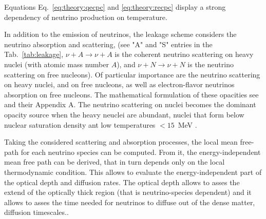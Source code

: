 %
Equations Eq.~\eqref{eq:theory:qecpc} and \eqref{eq:theory:recpc} display a strong dependency 
of neutrino production on temperature.
%
%


In addition to the emission of neutrinos, the leakage scheme considers the neutrino absorption and scattering, 
(see "A" and "S" entries in the Tab.~\ref{tab:leakage}, $\nu+A\rightarrow\nu+A$ is the coherent neutrino 
scattering on heavy nuclei (with atomic mass number $A$), and $\nu+N\rightarrow\nu+N$ 
is the neutrino scattering on free nucleons).
%
Of particular importance are the neutrino scattering on heavy nuclei, and on free nucleons, 
as well as electron-flavor neutrinos absorption on free nucleons. 
The mathematical formulation of these opacities see \citet{Galeazzi:2013mia} and their Appendix A.
%
The neutrino scattering on nuclei becomes the dominant opacity source when the heavy neuclei 
are abundant, nuclei that form below nuclear saturation density ant low temperatures $<15$~MeV \citep{Rosswog:2003rv}.

Taking the considered scattering and absorption processes, the local mean free-path for each neutrino species 
can be computed. From it, the energy-independent mean free path can be derived, that in turn depends 
only on the local thermodynamic condition. 
This allows to evaluate the energy-independent part of the optical depth and diffusion rates.
%
The optical depth allows to asses the extend of the optically thick region 
(that is neutrino-species dependent) and it allows to asses the time needed for neutrinos to 
diffuse out of the dense matter, diffusion timescales.. 
%

